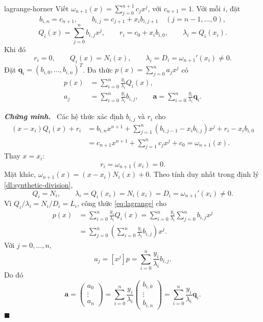 \documentclass[12pt,a4paper,oneside]{book}
\numberwithin{algorithm}{chapter}
\theoremstyle{definition}
\newenvironment{chungminh}{\par\medskip\noindent\textbf{\textit{\color{mainblue}Chứng minh.}}\ }{\hfill$\blacksquare$\par\medskip}
\begin{document}
\begin{menhde}{}{lagrange-horner}
Viết $\omega_{n+1}(x)=\sum_{j=0}^{n+1}c_jx^j$, với $c_{n+1}=1$. Với mỗi $i$, đặt
\[
 b_{i,n}=c_{n+1},\qquad
 b_{i,j}=c_{j+1}+x_ib_{i,j+1}\quad(j=n-1,\ldots,0),
\]
\[
 Q_i(x)=\sum_{j=0}^nb_{i,j}x^j,\qquad
 r_i=c_0+x_ib_{i,0},\qquad\lambda_i=Q_i(x_i).
\]
Khi đó
\[
 r_i=0,\qquad Q_i(x)=N_i(x),\qquad
 \lambda_i=D_i=\omega_{n+1}'(x_i)\ne0.
\]
Đặt $\mathbf q_i=(b_{i,0},\ldots,b_{i,n})^T$. Đa thức $p(x)=\sum_{j=0}^na_jx^j$ có
\begin{equation}\label{eq:lagrange-coefficients}
 \begin{aligned}
 p(x)&=\sum_{i=0}^n\frac{y_i}{\lambda_i}Q_i(x),\\
 a_j&=\sum_{i=0}^n\frac{y_i}{\lambda_i}b_{i,j},\qquad
 \mathbf a=\sum_{i=0}^n\frac{y_i}{\lambda_i}\mathbf q_i.
 \end{aligned}
\end{equation}
\end{menhde}
\begin{chungminh}
Các hệ thức xác định $b_{i,j}$ và $r_i$ cho
\begin{align*}
 (x-x_i)Q_i(x)+r_i
 &=b_{i,n}x^{n+1}
   +\sum_{j=1}^n(b_{i,j-1}-x_ib_{i,j})x^j+r_i-x_ib_{i,0}\\
 &=c_{n+1}x^{n+1}+\sum_{j=1}^nc_jx^j+c_0=\omega_{n+1}(x).
\end{align*}
Thay $x=x_i$:
\[
 r_i=\omega_{n+1}(x_i)=0.
\]
Mặt khác, $\omega_{n+1}(x)=(x-x_i)N_i(x)+0$. Theo tính duy nhất trong định lý \ref{dl:synthetic-division},
\[
 Q_i=N_i,\qquad
 \lambda_i=Q_i(x_i)=N_i(x_i)=D_i=\omega_{n+1}'(x_i)\ne0.
\]
Vì $Q_i/\lambda_i=N_i/D_i=L_i$, công thức \eqref{eq:lagrange} cho
\begin{align*}
 p(x)&=\sum_{i=0}^n\frac{y_i}{\lambda_i}Q_i(x)
 =\sum_{i=0}^n\frac{y_i}{\lambda_i}\sum_{j=0}^nb_{i,j}x^j\\
 &=\sum_{j=0}^n\left(\sum_{i=0}^n\frac{y_i}{\lambda_i}b_{i,j}\right)x^j.
\end{align*}
Với $j=0,\ldots,n$,
\[
 a_j=[x^j]p=\sum_{i=0}^n\frac{y_i}{\lambda_i}b_{i,j}.
\]
Do đó
\[
 \mathbf a=\begin{pmatrix}a_0\\\vdots\\a_n\end{pmatrix}
 =\sum_{i=0}^n\frac{y_i}{\lambda_i}
   \begin{pmatrix}b_{i,0}\\\vdots\\b_{i,n}\end{pmatrix}
 =\sum_{i=0}^n\frac{y_i}{\lambda_i}\mathbf q_i.
\]
\end{chungminh}
\end{document}
